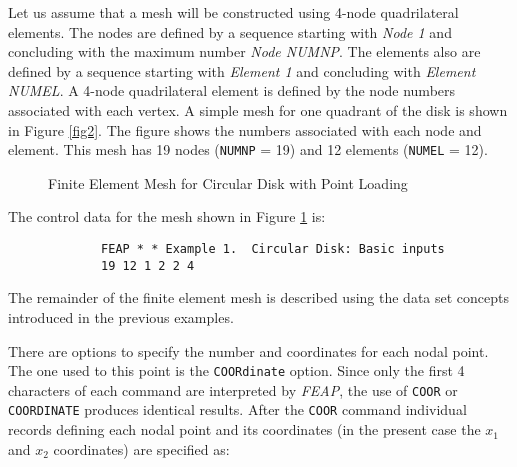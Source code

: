 Let us assume that a mesh will be constructed using 4-node
quadrilateral elements.  The nodes are defined by a sequence
starting with {\it Node 1} and concluding with the maximum number {\it
Node NUMNP}.
The elements also are defined by a sequence starting with {\it Element 1}
and concluding with {\it Element NUMEL}.
A 4-node quadrilateral element is defined by
the node numbers associated with each vertex.  A simple
mesh for one quadrant of the disk is shown in Figure \ref{fig2}.
The figure shows
the numbers associated with each node and element.
This mesh has 19 nodes ({\tt NUMNP} = 19) and 12 elements ({\tt NUMEL} = 12).

\begin{figure}[ht!]
\epsfxsize=2.8in
\centerline {\hfil {} \hfil}
\caption{Finite Element Mesh for Circular Disk with Point Loading}
\label{fig4}
\end{figure}

The control data for the mesh shown in Figure \ref{fig4} is:
\begin{verbatim}
             FEAP * * Example 1.  Circular Disk: Basic inputs
             19 12 1 2 2 4
\end{verbatim}
The remainder of the finite
element mesh is described using the data set concepts introduced in the
previous examples.

There are options to specify the number and coordinates for each
nodal point.  The one used to this point is the {\tt COORdinate} option.
Since only the first 4 characters of each command
are interpreted by {\sl FEAP}, the use of {\tt COOR} or {\tt COORDINATE}
produces identical results.
After the {\tt COOR} command individual records defining each nodal point
and its coordinates (in the present case the $x_1$ and $x_2$ coordinates)
are specified as:

